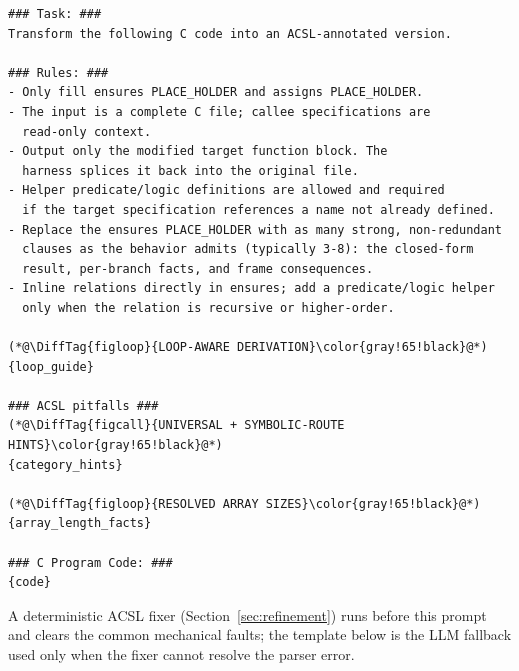 \leavevmode\par\nobreak\vspace{6pt}

\begin{tcolorbox}[promptboxcompact, title={Postcondition / assignment generation prompt}]
\begin{lstlisting}[style=PromptInnerCompact]
### Task: ###
Transform the following C code into an ACSL-annotated version.

### Rules: ###
- Only fill ensures PLACE_HOLDER and assigns PLACE_HOLDER.
- The input is a complete C file; callee specifications are
  read-only context.
- Output only the modified target function block. The
  harness splices it back into the original file.
- Helper predicate/logic definitions are allowed and required
  if the target specification references a name not already defined.
- Replace the ensures PLACE_HOLDER with as many strong, non-redundant
  clauses as the behavior admits (typically 3-8): the closed-form
  result, per-branch facts, and frame consequences.
- Inline relations directly in ensures; add a predicate/logic helper
  only when the relation is recursive or higher-order.

(*@\DiffTag{figloop}{LOOP-AWARE DERIVATION}\color{gray!65!black}@*)
{loop_guide}

### ACSL pitfalls ###
(*@\DiffTag{figcall}{UNIVERSAL + SYMBOLIC-ROUTE HINTS}\color{gray!65!black}@*)
{category_hints}

(*@\DiffTag{figloop}{RESOLVED ARRAY SIZES}\color{gray!65!black}@*)
{array_length_facts}

### C Program Code: ###
{code}
\end{lstlisting}
\end{tcolorbox}


A deterministic ACSL fixer (Section~\ref{sec:refinement}) runs before this prompt and clears the common mechanical faults; the template below is the LLM fallback used only when the fixer cannot resolve the parser error.

